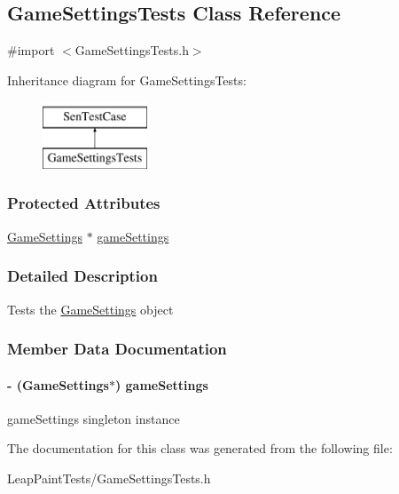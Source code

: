 \hypertarget{interface_game_settings_tests}{\subsection{Game\-Settings\-Tests Class Reference}
\label{d9/ddc/interface_game_settings_tests}
}


{\ttfamily \#import $<$Game\-Settings\-Tests.\-h$>$}

Inheritance diagram for Game\-Settings\-Tests\-:\begin{figure}[H]
\begin{center}
\leavevmode
\includegraphics[height=2.000000cm]{d9/ddc/interface_game_settings_tests}
\end{center}
\end{figure}
\subsubsection*{Protected Attributes}
\begin{DoxyCompactItemize}
\item 
\hyperlink{interface_game_settings}{Game\-Settings} $\ast$ \hyperlink{interface_game_settings_tests_abe72ed6a60e61029a7f71293ffef436e}{game\-Settings}
\end{DoxyCompactItemize}


\subsubsection{Detailed Description}
Tests the \hyperlink{interface_game_settings}{Game\-Settings} object 

\subsubsection{Member Data Documentation}
\hypertarget{interface_game_settings_tests_abe72ed6a60e61029a7f71293ffef436e}{
\paragraph[{game\-Settings}]{\setlength{\rightskip}{0pt plus 5cm}-\/ ({\bf Game\-Settings}$\ast$) game\-Settings\hspace{0.3cm}{\ttfamily [protected]}}}\label{d9/ddc/interface_game_settings_tests_abe72ed6a60e61029a7f71293ffef436e}
game\-Settings singleton instance 

The documentation for this class was generated from the following file\-:\begin{DoxyCompactItemize}
\item 
Leap\-Paint\-Tests/Game\-Settings\-Tests.\-h\end{DoxyCompactItemize}
